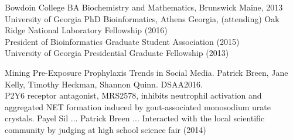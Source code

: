 


Bowdoin College BA Biochemistry and Mathematics, Brunswick Maine,  2013 \\
University of Georgia PhD Bioinformatics, Athens Georgia, (attending)
Oak Ridge National Laboratory Fellowship (2016) \\
President of Bioinformatics Graduate Student Association (2015) \\
University of Georgia Presidential Graduate Fellowship (2013)

Mining Pre-Exposure Prophylaxis Trends in Social Media. Patrick Breen, Jane Kelly, Timothy Heckman, Shannon Quinn. DSAA2016. \\
P2Y6 receptor antagonist, MRS2578, inhibits neutrophil activation and aggregated NET formation induced by gout-associated monosodium urate crystals. Payel Sil ... Patrick Breen ...
Interacted with the local scientific community by judging at high school science fair (2014)



